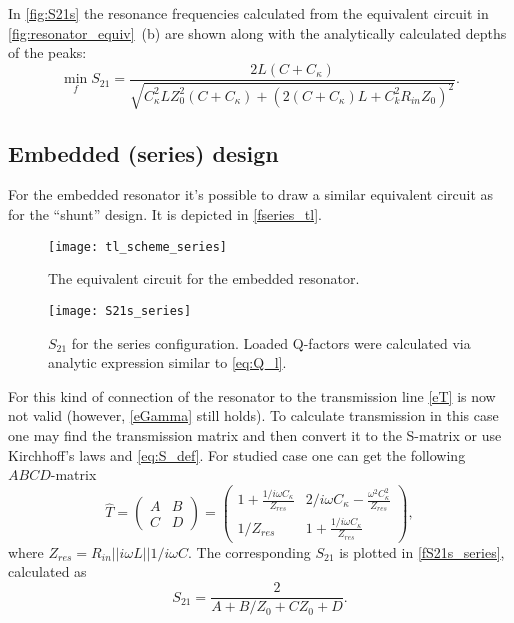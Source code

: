 \documentclass[12pt, twoside]{report}
\newcommand{\rbrkt}[1]{\left( #1 \right)}
\numberwithin{equation}{section}
\begin{document}
In \autoref{fig:S21s} the resonance frequencies calculated from the equivalent circuit in \autoref{fig:resonator_equiv}~(b) are shown along with the analytically calculated depths of the peaks:
\begin{equation}
\min_f S_{21} = \frac{2 L \left(C + C_{\kappa}\right)}{\sqrt{C_{\kappa}^{2} L Z_{0}^{2} \left(C + C_{\kappa}\right) + \left(2 (C+C_\kappa) L + C_{k}^{2} R_{in} Z_{0} \right)^{2}}}.
\end{equation}

\subsection{Embedded (series) design}

For the embedded resonator it's possible to draw a similar equivalent circuit as for the ``shunt'' design\cite{Goppl2008}. It is depicted in \autoref{fseries_tl}. 

\begin{figure}[h]
\centering
\texttt{[image: tl\_scheme\_series]}
\caption{The equivalent circuit for the embedded resonator.}
\label{fseries_tl}
\end{figure}
\begin{figure}[h]
\centering
\texttt{[image: S21s\_series]}
\caption{$S_{21}$ for the series configuration. Loaded Q-factors were calculated  via analytic expression similar to \eqref{eq:Q_l}.}
\label{fS21s_series}
\end{figure}

For this kind of connection of the resonator to the transmission line \eqref{eT} is now not valid (however, \eqref{eGamma} still holds). To calculate transmission in this case one may find the transmission matrix and then convert it to the S-matrix or use Kirchhoff's laws and \eqref{eq:S_def}. For studied case one can get the following $ABCD$-matrix\cite{pozar2012}
\begin{equation}
\hat T = \rbrkt{\begin{matrix}
A & B \\
C & D
\end{matrix}} = \rbrkt{\begin{matrix}
1 + \frac{1/i\omega C_\kappa}{Z_{res}} & 2/i\omega C_\kappa - \frac{\omega^2 C_\kappa^2}{Z_{res}} \\
1/Z_{res} &  1 + \frac{1/i\omega C_\kappa}{Z_{res}} 
\end{matrix}},
\end{equation}
where $Z_{res} = R_{in}||i\omega L || 1/i\omega C$. The corresponding $S_{21}$ is plotted in \autoref{fS21s_series}, calculated as\cite{pozar2012} 
\begin{equation}
S_{21} = \frac{2}{A+B/Z_0 +CZ_0 + D}.
\end{equation}
\end{document}
